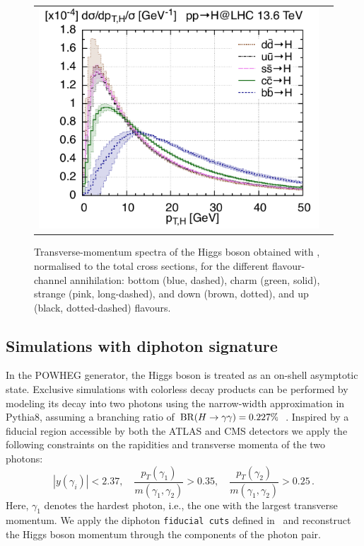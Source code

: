\documentclass[11pt,a4paper]{article}
\begin{document}
\begin{figure}[t!]
\begin{center}
\begin{tabular}{cc}
\includegraphics[width=.62\textwidth, page=1]{plots/5fs/light/ptHzoom_qqH.pdf}
\end{tabular}
\vspace*{1ex}
\caption{Transverse-momentum spectra of the Higgs boson obtained with \minnlo{}, normalised to the total cross sections, for the different flavour-channel annihilation: bottom (blue, dashed), charm (green, solid), strange (pink, long-dashed), and down (brown, dotted), and  up (black, dotted-dashed) flavours.
\label{fig:lightpTHzoom}}
\end{center}
\end{figure}

\subsection{Simulations with diphoton signature}
In the POWHEG generator, the Higgs boson is treated as an on-shell asymptotic state. Exclusive simulations with colorless decay products can be performed by modeling its decay into two photons using the narrow-width approximation in Pythia8, assuming a branching ratio of \({\rm BR}(H \to \gamma\gamma) = 0.227\%\)~\cite{LHCHiggsCrossSectionWorkingGroup:2016ypw}.
Inspired by a fiducial region accessible by both the ATLAS and CMS detectors we apply the following constraints on the rapidities and transverse momenta of the two photons:
\begin{equation}
|y(\gamma_i)|< 2.37, \quad
\frac{p_T(\gamma_1)}{m(\gamma_1, \gamma_2)} > 0.35,\quad \frac{p_T(\gamma_2)}{m(\gamma_1, \gamma_2)} > 0.25\,. \label{eq:aafidmycuts}
\end{equation}
Here, \( \gamma_1 \) denotes the hardest photon, i.e., the one with the largest transverse momentum. We apply the diphoton \texttt{fiducial cuts} defined in~ and reconstruct the Higgs boson momentum through the components of the photon pair.
\end{document}
